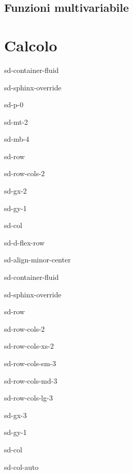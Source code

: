 \documentclass[letterpaper,10pt,italian]{jupyterBook}
\begin{document}
\chapter{Funzioni multi\sphinxhyphen{}variabile}
\label{\detokenize{ch/precalculus/multivariable-real-fun:funzioni-multi-variabile}}\label{\detokenize{ch/precalculus/multivariable-real-fun:math-hs-precalculus-multivariable-real-fun}}\label{\detokenize{ch/precalculus/multivariable-real-fun::doc}}
\sphinxstepscope


\part{Calcolo}

\sphinxstepscope

\begin{sphinxuseclass}{sd-container-fluid}
\begin{sphinxuseclass}{sd-sphinx-override}
\begin{sphinxuseclass}{sd-p-0}
\begin{sphinxuseclass}{sd-mt-2}
\begin{sphinxuseclass}{sd-mb-4}
\begin{sphinxuseclass}{sd-row}
\begin{sphinxuseclass}{sd-row-cols-2}
\begin{sphinxuseclass}{sd-gx-2}
\begin{sphinxuseclass}{sd-gy-1}
\begin{sphinxuseclass}{sd-col}
\begin{sphinxuseclass}{sd-d-flex-row}
\begin{sphinxuseclass}{sd-align-minor-center}
\begin{sphinxuseclass}{sd-container-fluid}
\begin{sphinxuseclass}{sd-sphinx-override}
\begin{sphinxuseclass}{sd-row}
\begin{sphinxuseclass}{sd-row-cols-2}
\begin{sphinxuseclass}{sd-row-cols-xs-2}
\begin{sphinxuseclass}{sd-row-cols-sm-3}
\begin{sphinxuseclass}{sd-row-cols-md-3}
\begin{sphinxuseclass}{sd-row-cols-lg-3}
\begin{sphinxuseclass}{sd-gx-3}
\begin{sphinxuseclass}{sd-gy-1}
\begin{sphinxuseclass}{sd-col}
\begin{sphinxuseclass}{sd-col-auto}

\end{sphinxuseclass}
\end{sphinxuseclass}
\end{sphinxuseclass}
\end{sphinxuseclass}
\end{sphinxuseclass}
\end{sphinxuseclass}
\end{sphinxuseclass}
\end{sphinxuseclass}
\end{sphinxuseclass}
\end{sphinxuseclass}
\end{sphinxuseclass}
\end{sphinxuseclass}
\end{sphinxuseclass}
\end{sphinxuseclass}
\end{sphinxuseclass}
\end{sphinxuseclass}
\end{sphinxuseclass}
\end{sphinxuseclass}
\end{sphinxuseclass}
\end{sphinxuseclass}
\end{sphinxuseclass}
\end{sphinxuseclass}
\end{sphinxuseclass}
\end{sphinxuseclass}
\end{document}
